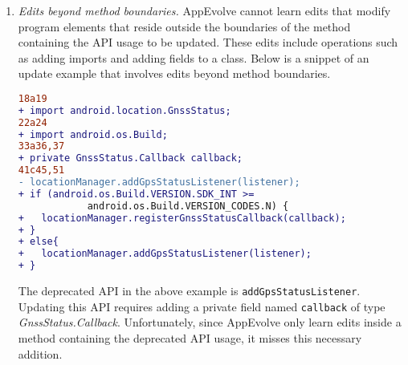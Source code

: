 \begin{enumerate}
\item {\em Edits beyond method boundaries.} AppEvolve cannot learn edits that modify program elements that reside outside the boundaries of the method containing the API usage to be updated. These edits include operations such as adding imports and adding fields to a class. Below is a snippet of an update example that involves edits beyond method boundaries.
\begin{lstlisting}[language=diff,numbers=none,caption=Edits that add imports and a private field,captionpos=b, label=lst:complexexpress]
18a19
+ import android.location.GnssStatus;
22a24
+ import android.os.Build;
33a36,37
+ private GnssStatus.Callback callback;
41c45,51
- locationManager.addGpsStatusListener(listener);
+ if (android.os.Build.VERSION.SDK_INT >= 
            android.os.Build.VERSION_CODES.N) {
+   locationManager.registerGnssStatusCallback(callback);
+ }
+ else{
+   locationManager.addGpsStatusListener(listener);
+ }
\end{lstlisting}
The deprecated API in the above example is {\tt addGpsStatusListener}. Updating this API requires adding a private field named {\tt callback} of type {\em GnssStatus.Callback}. Unfortunately, since AppEvolve only learn edits inside a method containing the deprecated API usage, it misses this necessary addition.


\end{enumerate}
